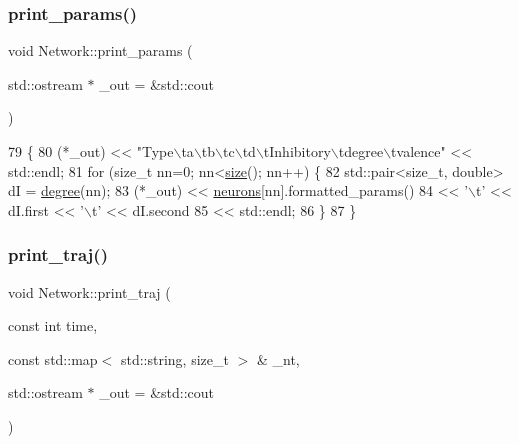 \subsubsection{\texorpdfstring{print\+\_\+params()}{print\_params()}}
{\footnotesize\ttfamily void Network\+::print\+\_\+params (\begin{DoxyParamCaption}\item[{std\+::ostream $\ast$}]{\+\_\+out = {\ttfamily \&std\+:\+:cout} }\end{DoxyParamCaption})}


\begin{DoxyCode}
79                                            \{
80     (*\_out) << \textcolor{stringliteral}{"Type\(\backslash\)ta\(\backslash\)tb\(\backslash\)tc\(\backslash\)td\(\backslash\)tInhibitory\(\backslash\)tdegree\(\backslash\)tvalence"} << std::endl;
81     \textcolor{keywordflow}{for} (\textcolor{keywordtype}{size\_t} nn=0; nn<\hyperlink{classNetwork_a41c54d12d861883170b5c5abca3a7bc8}{size}(); nn++) \{
82         std::pair<size\_t, double> dI = \hyperlink{classNetwork_a06de035ba134c5aed590bd5f9f8035d1}{degree}(nn);
83         (*\_out) << \hyperlink{classNetwork_a1b7832bc2c7b8855cdc3b2d6329eff9d}{neurons}[nn].formatted\_params() 
84                 << \textcolor{charliteral}{'\(\backslash\)t'} << dI.first << \textcolor{charliteral}{'\(\backslash\)t'} << dI.second
85                 << std::endl;
86     \}
87 \}
\end{DoxyCode}
\mbox{\label{classNetwork_ae460d31557bba058fdf66e4fe5feb801}} 
\subsubsection{\texorpdfstring{print\+\_\+traj()}{print\_traj()}}
{\footnotesize\ttfamily void Network\+::print\+\_\+traj (\begin{DoxyParamCaption}\item[{const int}]{time,  }\item[{const std\+::map$<$ std\+::string, size\+\_\+t $>$ \&}]{\+\_\+nt,  }\item[{std\+::ostream $\ast$}]{\+\_\+out = {\ttfamily \&std\+:\+:cout} }\end{DoxyParamCaption})}


